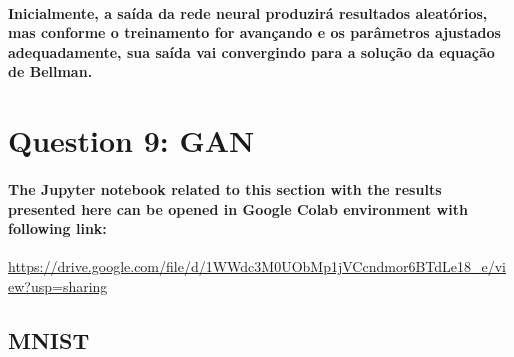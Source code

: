 \documentclass[a4paper]{article}    %
\begin{document}
\paragraph{Inicialmente, a saída da rede neural produzirá resultados aleatórios, mas conforme o treinamento for avançando e os parâmetros ajustados adequadamente, sua saída vai convergindo para a solução da equação de Bellman.}

\newpage
\section{Question 9: GAN}

\paragraph{The Jupyter notebook related to this section with the results presented here can be opened in Google Colab environment with following link:\\}

\href{https://drive.google.com/file/d/1WWdc3M0UObMp1jVCcndmor6BTdLe18\_e/view?usp=sharing}{https://drive.google.com/file/d/1WWdc3M0UObMp1jVCcndmor6BTdLe18\_e/view?usp=sharing}

\subsection{MNIST}

\graphicspath{{../figures/Q9/mnist/}}
\end{document}
